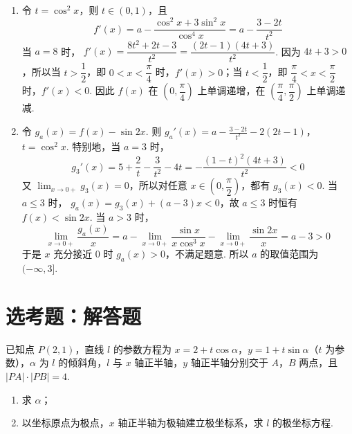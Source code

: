 \begin{solution}
\begin{enumerate}
\item 令 \(t=\cos^2x\)，则 \(t\in(0,1)\)，且
\[
f'(x)=a-\frac{\cos^2x+3\sin^2x}{\cos^4x}
=a-\frac{3-2t}{t^2}
\]
当 \(a=8\) 时，
\(f'(x)=\dfrac{8t^2+2t-3}{t^2}=\dfrac{(2t-1)(4t+3)}{t^2}\). 因为 \(4t+3>0\)，所以当 \(t>\dfrac12\)，即 \(0<x<\dfrac\pi4\) 时，\(f'(x)>0\)；当 \(t<\dfrac12\)，即 \(\dfrac\pi4<x<\dfrac\pi2\) 时，\(f'(x)<0\). 因此 \(f(x)\) 在 \(\left(0,\dfrac\pi4\right)\) 上单调递增，在 \(\left(\dfrac\pi4,\dfrac\pi2\right)\) 上单调递减.
\item 令 \(g_a(x)=f(x)-\sin2x\). 则
\(g_a'(x)=a-\frac{3-2t}{t^2}-2(2t-1)\)，\(t=\cos^2x\).
特别地，当 \(a=3\) 时，
\[
g_3'(x)=5+\frac2t-\frac3{t^2}-4t
=-\frac{(1-t)^2(4t+3)}{t^2}<0
\]
又 \(\displaystyle\lim_{x\to0+}g_3(x)=0\)，所以对任意 \(x\in\left(0,\dfrac\pi2\right)\)，都有 \(g_3(x)<0\). 当 \(a\leq3\) 时，
\(g_a(x)=g_3(x)+(a-3)x<0\)，故 \(a\leq3\) 时恒有 \(f(x)<\sin2x\). 当 \(a>3\) 时，
\[
\lim_{x\to0+}\frac{g_a(x)}{x}
=a-\lim_{x\to0+}\frac{\sin x}{x\cos^3x}-\lim_{x\to0+}\frac{\sin2x}{x}
=a-3>0
\]
于是 \(x\) 充分接近 \(0\) 时 \(g_a(x)>0\)，不满足题意. 所以 \(a\) 的取值范围为 \((-\infty,3]\).
\end{enumerate}
\end{solution}

\section{选考题：解答题}

\begin{problem}
已知点 \( P(2,1) \)，直线 \( l \) 的参数方程为 \( x=2+t\cos\alpha \)，\( y=1+t\sin\alpha \)（\( t \) 为参数），\( \alpha \) 为 \( l \) 的倾斜角，\( l \) 与 \( x \) 轴正半轴，\( y \) 轴正半轴分别交于 \(A\)，\(B\) 两点，且 \( \lvert PA \rvert\cdot\lvert PB \rvert=4 \).

\begin{enumerate}
\item 求 \( \alpha \)；
\item 以坐标原点为极点，\( x \) 轴正半轴为极轴建立极坐标系，求 \( l \) 的极坐标方程.
\end{enumerate}
\end{problem}

